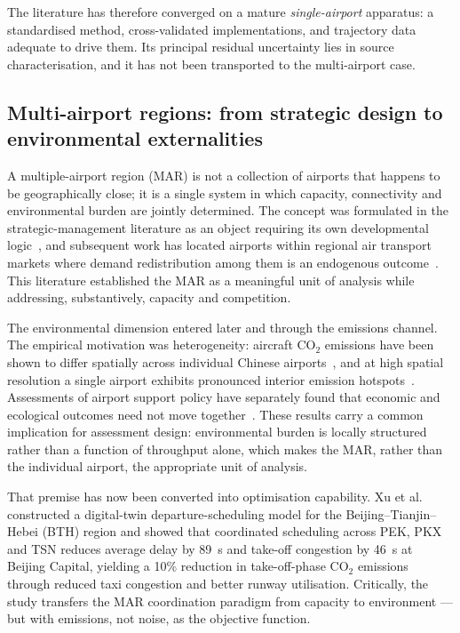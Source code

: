 \documentclass[review,12pt]{elsarticle}
\begin{document}
The literature has therefore converged on a mature \emph{single-airport}
apparatus: a standardised method, cross-validated implementations, and
trajectory data adequate to drive them. Its principal residual uncertainty
lies in source characterisation, and it has not been transported to the
multi-airport case.

\subsection{Multi-airport regions: from strategic design to environmental externalities}
\label{sec:lr-mar}

A multiple-airport region (MAR) is not a collection of airports that happens
to be geographically close; it is a single system in which capacity,
connectivity and environmental burden are jointly determined. The concept was
formulated in the strategic-management literature as an object requiring its own
developmental logic~\citep{deneufville1995management}, and subsequent work has
located airports within regional air transport markets where demand
redistribution among them is an endogenous outcome~\citep{oconnor2016airports}.
This literature established the MAR as a meaningful unit of analysis while
addressing, substantively, capacity and competition.

The environmental dimension entered later and through the emissions channel.
The empirical motivation was heterogeneity: aircraft CO$_2$ emissions have been
shown to differ spatially across individual Chinese
airports~\citep{hu2020spatial}, and at high spatial resolution a single airport
exhibits pronounced interior emission hotspots~\citep{han2025high}. Assessments
of airport support policy have separately found that economic and ecological
outcomes need not move together~\citep{wu2021evaluating}. These results carry a
common implication for assessment design: environmental burden is locally
structured rather than a function of throughput alone, which makes the MAR,
rather than the individual airport, the appropriate unit of analysis.

That premise has now been converted into optimisation capability. Xu et
al.~\cite{xu2025flight} constructed a digital-twin departure-scheduling model for
the Beijing--Tianjin--Hebei (BTH) region and showed that coordinated scheduling
across PEK, PKX and TSN reduces average delay by 89~s and take-off congestion by
46~s at Beijing Capital, yielding a 10\% reduction in take-off-phase
CO$_2$ emissions through reduced taxi congestion and better runway utilisation.
Critically, the study transfers the MAR coordination paradigm from capacity to
environment --- but with emissions, not noise, as the objective function.
\end{document}
